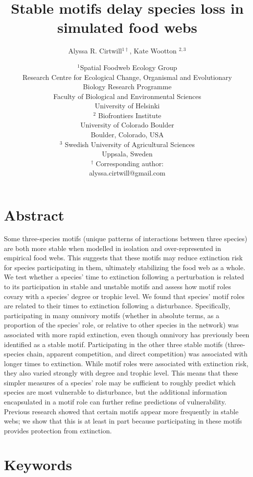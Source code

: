 \documentclass[12pt]{article}
\title{Stable motifs delay species loss in simulated food webs}
\author{Alyssa R. Cirtwill$^{1\dagger}$, Kate Wootton $^{2,3}$}
\date{\small$^1$Spatial Foodweb Ecology Group\\
Research Centre for Ecological Change, Organismal and Evolutionary\\
Biology Research Programme\\
Faculty of Biological and Environmental
Sciences\\
University of Helsinki\\
\medskip
\small$^2$ Biofrontiers Institute\\
University of Colorado Boulder\\
Boulder, Colorado, USA\\
\medskip
\small$^3$ Swedish University of Agricultural Sciences\\
Uppsala, Sweden\\
\medskip
$^\dagger$ Corresponding author:\\
alyssa.cirtwill@gmail.com\\
 }
\begin{document}
 
\maketitle 
\raggedright
\setlength{\parindent}{15pt} 

\clearpage
\linenumbers
\begin{spacing}{2.0}

\section*{Abstract} %
    Some three-species motifs (unique patterns of interactions between three species) are both more stable when modelled in isolation and over-represented in empirical food webs. This suggests that these motifs may reduce extinction risk for species participating in them, ultimately stabilizing the food web as a whole. 
    We test whether a species' time to extinction following a perturbation is related to its participation in stable and unstable motifs and assess how motif roles covary with a species' degree or trophic level.
    We found that species' motif roles are related to their times to extinction following a disturbance. Specifically, participating in many omnivory motifs (whether in absolute terms, as a proportion of the species' role, or relative to other species in the network) was associated with more rapid extinction, even though omnivory has previously been identified as a stable motif. Participating in the other three stable motifs (three-species chain, apparent competition, and direct competition) was associated with longer times to extinction.
    While motif roles were associated with extinction risk, they also varied strongly with degree and trophic level. This means that these simpler measures of a species' role may be sufficient to roughly predict which species are most vulnerable to disturbance, but the additional information encapsulated in a motif role can further refine predictions of vulnerability. Previous research showed that certain motifs appear more frequently in stable webs; we show that this is at least in part because participating in these motifs provides protection from extinction.%

\section*{Keywords}


\end{spacing}
\end{document}
